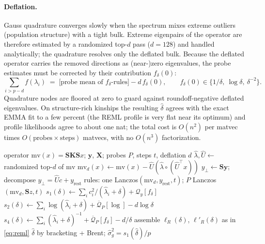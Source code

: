 \documentclass[11pt]{article}
\newcommand{\y}{\mathbf{y}}
\newcommand{\K}{\mathbf{K}}
\newcommand{\X}{\mathbf{X}}
\newcommand{\Sm}{\mathbf{S}}
\begin{document}
\paragraph{Deflation.} Gauss quadrature converges slowly when the
spectrum mixes extreme outliers (population structure) with a tight
bulk. Extreme eigenpairs of the operator are therefore estimated by a
randomized top-$d$ pass ($d = 128$) and handled analytically; the
quadrature resolves only the deflated bulk. Because the deflated
operator carries the removed directions as (near-)zero eigenvalues,
the probe estimates must be corrected by their contribution
$f_\delta(0)$:
\begin{equation}
  \sum_{i>p-d} f(\lambda_i) \;=\;
  \Big[\text{probe mean of } f_\delta\text{-rules}\Big] - d\,f_\delta(0),
  \qquad f_\delta(0) \in \{1/\delta,\ \log\delta,\ \delta^{-2}\}.
\end{equation}
Quadrature nodes are floored at zero to guard against roundoff-negative
deflated eigenvalues. On structure-rich kinships the resulting
$\hat\delta$ agrees with the exact EMMA fit to a few percent (the REML
profile is very flat near its optimum) and profile likelihoods agree to
about one nat; the total cost is $O(n^2)$ per matvec times
$O(\text{probes} \times \text{steps})$ matvecs, with no $O(n^3)$
factorization.

\begin{algorithm}[t]
\caption{Deflated SLQ variance-component fit}
\label{alg:slq}
\begin{algorithmic}[1]
\Require operator $\mathrm{mv}(x) = \Sm\K\Sm x$; $\y$, $\X$; probes $P$, steps $t$, deflation $d$
\State $\hat\lambda, \hat U \gets$ randomized top-$d$ of $\mathrm{mv}$
\State $\mathrm{mv}_d(x) \gets \mathrm{mv}(x) - \hat U(\hat\lambda \circ (\hat U^\top x))$
\State $y_\perp \gets \Sm\y$; decompose $y_\perp = \hat U c + y_{\mathrm{rest}}$
\State rules: one Lanczos$(\mathrm{mv}_d, y_{\mathrm{rest}}, t)$; $P$ Lanczos$(\mathrm{mv}_d, \Sm z, t)$
  \State $s_1(\delta) \gets \sum_i c_i^2/(\hat\lambda_i{+}\delta) + \mathcal{Q}_y[f_\delta]$
  \State $s_2(\delta) \gets \sum_i \log(\hat\lambda_i{+}\delta) + \overline{\mathcal{Q}}_P[\log] - d\log\delta$ 
  \State $s_4(\delta) \gets \sum_i (\hat\lambda_i{+}\delta)^{-1} + \overline{\mathcal{Q}}_P[f_\delta] - d/\delta$
  \State assemble $\ell_R(\delta)$, $\ell'_R(\delta)$ as in \eqref{eq:reml}
\EndFor
\State \Return $\hat\delta$ by bracketing + Brent; $\hat\sigma_g^2 = s_1(\hat\delta)/p$
\end{algorithmic}
\end{algorithm}
\end{document}
